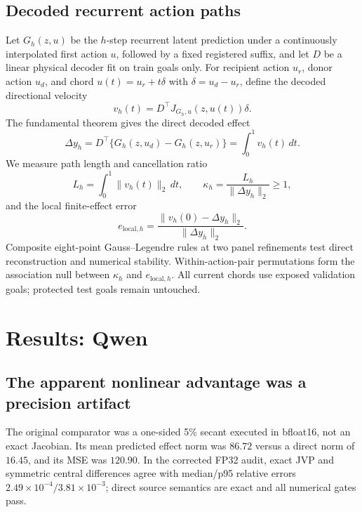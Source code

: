 \documentclass[10pt]{article}
\begin{document}
\subsection{Decoded recurrent action paths}

Let $G_h(z,u)$ be the $h$-step recurrent latent prediction under a continuously
interpolated first action $u$, followed by a fixed registered suffix, and let
$D$ be a linear physical decoder fit on train goals only.  For recipient action
$u_r$, donor action $u_d$, and chord $u(t)=u_r+t\delta$ with
$\delta=u_d-u_r$, define the decoded directional velocity
\begin{equation}
  v_h(t)=D^\top J_{G_h,u}(z,u(t))\delta.
\end{equation}
The fundamental theorem gives the direct decoded effect
\begin{equation}
  \Delta y_h = D^\top\{G_h(z,u_d)-G_h(z,u_r)\}
  = \int_0^1 v_h(t)\,dt.
\end{equation}
We measure path length and cancellation ratio
\begin{equation}
  L_h=\int_0^1\lVert v_h(t)\rVert_2\,dt,
  \qquad
  \kappa_h=\frac{L_h}{\lVert\Delta y_h\rVert_2} \geq 1,
\end{equation}
and the local finite-effect error
\begin{equation}
  e_{\mathrm{local},h}
  =\frac{\lVert v_h(0)-\Delta y_h\rVert_2}
  {\lVert\Delta y_h\rVert_2}.
\end{equation}
Composite eight-point Gauss--Legendre rules at two panel refinements test direct
reconstruction and numerical stability.  Within-action-pair permutations form
the association null between $\kappa_h$ and $e_{\mathrm{local},h}$.  All current
chords use exposed validation goals; protected test goals remain untouched.

\section{Results: Qwen}

\subsection{The apparent nonlinear advantage was a precision artifact}

The original comparator was a one-sided 5\% secant executed in bfloat16, not
an exact Jacobian.  Its mean predicted effect norm was $86.72$ versus a direct
norm of $16.45$, and its MSE was $120.90$.  In the corrected FP32 audit, exact
JVP and symmetric central differences agree with median/p95 relative errors
$2.49\times10^{-4}/3.81\times10^{-3}$; direct source semantics are exact and
all numerical gates pass.
\end{document}
